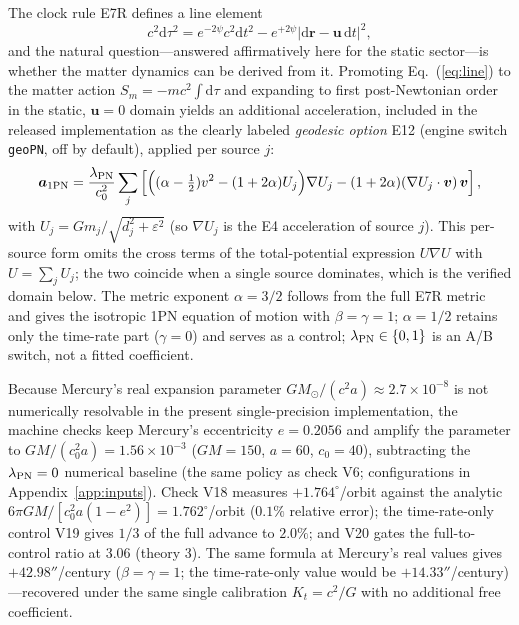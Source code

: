 \documentclass[aps,reprint,amsmath,amssymb,nofootinbib,superscriptaddress,floatfix]{revtex4-2}
\newcommand{\ud}{\mathrm{d}}
\newcommand{\vect}[1]{\bm{#1}}
\newcommand{\Kt}{K_t}
\begin{document}
The clock rule E7R defines a line element
\begin{equation}
c^2\ud\tau^2 = e^{-2\psi}c^2\ud t^2
 - e^{+2\psi}\left|\ud\vect{r}-\vect{u}\,\ud t\right|^2 ,
\label{eq:line}
\end{equation}
and the natural question---answered affirmatively here for the static
sector---is whether the matter dynamics can be derived from it.
Promoting Eq.~(\ref{eq:line}) to the matter action
$S_m = -mc^2\!\int\!\ud\tau$ and expanding to first post-Newtonian
order in the static, $\vect{u} = 0$ domain yields an additional
acceleration, included in the released implementation as the clearly
labeled \emph{geodesic option} E12 (engine switch \texttt{geoPN}, off
by default), applied per source $j$:
\begin{equation}
\vect{a}_{\rm 1PN} = \frac{\lambda_{\rm PN}}{c_0^2}\sum_j
 \left[\Bigl((\alpha-\tfrac12)v^2 - (1+2\alpha)U_j\Bigr)\nabla U_j
 - (1+2\alpha)(\nabla U_j\cdot\vect{v})\,\vect{v}\right],
\label{eq:e12}
\end{equation}
with $U_j = Gm_j/\sqrt{d_j^2+\varepsilon^2}$ (so $\nabla U_j$ is the
E4 acceleration of source $j$).
This per-source form omits the cross terms of the total-potential
expression $U\nabla U$ with $U = \sum_j U_j$; the two coincide when a
single source dominates, which is the verified domain below.
The metric exponent $\alpha = 3/2$ follows from the full E7R metric
and gives the isotropic 1PN equation of motion with
$\beta = \gamma = 1$; $\alpha = 1/2$ retains only the time-rate part
($\gamma = 0$) and serves as a control; $\lambda_{\rm PN} \in \{0,1\}$
is an A/B switch, not a fitted coefficient.

Because Mercury's real expansion parameter
$GM_\odot/(c^2a) \approx 2.7\times10^{-8}$ is not numerically
resolvable in the present single-precision implementation, the
machine checks keep Mercury's
eccentricity $e = 0.2056$ and amplify the parameter to
$GM/(c_0^2a) = 1.56\times10^{-3}$ ($GM = 150$, $a = 60$, $c_0 = 40$),
subtracting the $\lambda_{\rm PN} = 0$ numerical baseline (the same
policy as check V6; configurations in Appendix~\ref{app:inputs}).
Check V18 measures $+1.764^\circ$/orbit against the analytic
$6\pi GM/[c_0^2a(1-e^2)] = 1.762^\circ$/orbit ($0.1\%$ relative
error); the time-rate-only control V19 gives $1/3$ of the full advance
to $2.0\%$; and V20 gates the full-to-control ratio at $3.06$ (theory
$3$).
The same formula at Mercury's real values gives $+42.98''$/century
($\beta = \gamma = 1$; the time-rate-only value would be
$+14.33''$/century)---recovered under the same single calibration
$\Kt = c^2/G$ with no additional free coefficient.
\end{document}
